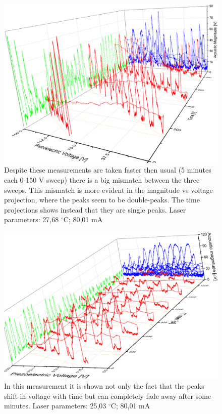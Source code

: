 \begin{landscape}
\begin{figure}[!bhtp]\centering
\includegraphics[height=\textheight, draft=\foto]{eps/3mismatching.eps}
\caption{Despite these measurements are taken faster then usual (5 minutes each 0-150 V sweep) there is a big mismatch between the three sweeps. This mismatch is more evident in the magnitude vs voltage projection, where the peaks seem to be double-peaks. The time projections shows instead that they are
single peaks. Laser parameters: 27,68 $^{\circ}$C; 80,01 mA}
\label{3missweep}
\end{figure}\vfill
\end{landscape}

\begin{landscape}
\begin{figure}[!bhtp]\centering
\includegraphics[height=\textheight, draft=\foto]{eps/7sweeps.eps}
\caption{In this measurement it is shown not only the fact that the peaks shift in voltage with time but can completely fade away after some minutes. Laser parameters: 25,03 $^{\circ}$C; 80,01 mA}
\label{7sweeps}
\end{figure}\vfill
\end{landscape}
  
